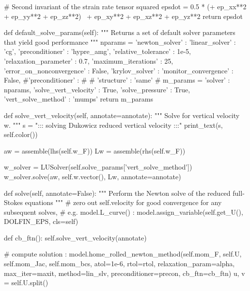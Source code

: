 \begin{python}[label=cslvr_reformulated_stokes, caption={\CSLVR source code contained in the \texttt{MomentumDukowiczStokesReduced} class.}]
  # Second invariant of the strain rate tensor squared
  epsdot = 0.5 * (+ ep_xx**2 + ep_yy**2 + ep_zz**2) \
                  + ep_xy**2 + ep_xz**2 + ep_yz**2
  return epsdot

def default_solve_params(self):
  """ 
  Returns a set of default solver parameters that yield good performance
  """
  nparams = {'newton_solver' :
            {
              'linear_solver'            : 'cg',
              'preconditioner'           : 'hypre_amg',
              'relative_tolerance'       : 1e-5,
              'relaxation_parameter'     : 0.7,
              'maximum_iterations'       : 25,
              'error_on_nonconvergence'  : False,
              'krylov_solver'            :
              {
                'monitor_convergence'   : False,
                #'preconditioner' :
                #{
                #  'structure' : 'same'
                #}
              }
            }}
  m_params  = {'solver'               : nparams,
               'solve_vert_velocity'  : True,
               'solve_pressure'       : True,
               'vert_solve_method'    : 'mumps'}
  return m_params

def solve_vert_velocity(self, annotate=annotate):
  """ 
  Solve for vertical velocity w.
  """
  s    = "::: solving Dukowicz reduced vertical velocity :::"
  print_text(s, self.color())
  
  aw       = assemble(lhs(self.w_F))
  Lw       = assemble(rhs(self.w_F))
  
  w_solver = LUSolver(self.solve_params['vert_solve_method'])
  w_solver.solve(aw, self.w.vector(), Lw, annotate=annotate)

def solve(self, annotate=False):
  """ 
  Perform the Newton solve of the reduced full-Stokes equations 
  """
  # zero out self.velocity for good convergence for any subsequent solves,
  # e.g. model.L_curve() :
  model.assign_variable(self.get_U(), DOLFIN_EPS, cls=self)

  def cb_ftn():
    self.solve_vert_velocity(annotate)
  
  # compute solution :
  model.home_rolled_newton_method(self.mom_F, self.U, self.mom_Jac, 
                                  self.mom_bcs, atol=1e-6, rtol=rtol,
                                  relaxation_param=alpha, max_iter=maxit,
                                  method=lin_slv, preconditioner=precon,
                                  cb_ftn=cb_ftn)
  u, v = self.U.split()
\end{python}




